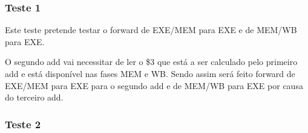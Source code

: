 \documentclass[pdftex,12pt,a4paper]{report}
\begin{document}
\subsubsection{Teste 1}
Este teste pretende testar o forward de EXE/MEM para EXE e de MEM/WB para EXE.

\begin{table}[!htb]
\centering
\label{my-label}
\end{table}

O segundo add vai necessitar de ler o \$3 que está a ser calculado  pelo primeiro add e está disponível nas fases MEM e WB. Sendo assim será feito forward de EXE/MEM para EXE para o segundo add e de MEM/WB para EXE por causa do terceiro add.

\subsubsection{Teste 2}
\end{document}
